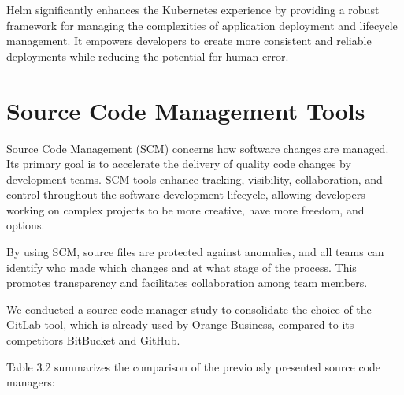 Helm significantly enhances the Kubernetes experience by providing a robust framework for managing the complexities of application deployment and lifecycle management. It empowers developers to create more consistent and reliable deployments while reducing the potential for human error.


\section{Source Code Management Tools}

Source Code Management (SCM) concerns how software changes are managed. Its primary goal is to accelerate the delivery of quality code changes by development teams. SCM tools enhance tracking, visibility, collaboration, and control throughout the software development lifecycle, allowing developers working on complex projects to be more creative, have more freedom, and options.

By using SCM, source files are protected against anomalies, and all teams can identify who made which changes and at what stage of the process. This promotes transparency and facilitates collaboration among team members.

We conducted a source code manager study to consolidate the choice of the GitLab tool, which is already used by Orange Business, compared to its competitors BitBucket and GitHub.

Table 3.2 summarizes the comparison of the previously presented source code managers:

\begin{table}[h]
  \centering
  \caption{Comparison of source code management tools}
\end{table}

